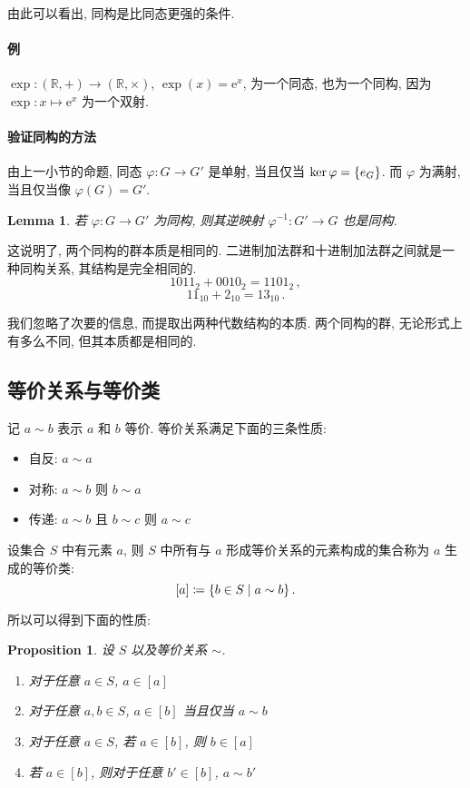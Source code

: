 \documentclass[UTF8]{ctexart}
\theoremstyle{mystyle}
\newtheorem{lemma}{Lemma}[section]
\newtheorem{proposition}{Proposition}[section]
\theoremstyle{myremark}
\theoremstyle{plain}
\newcommand{\mr}{\mathrm}
\newcommand{\R}{\mathbb R}
\DeclarePairedDelimiter\set{\{}{\}}
\begin{document}
由此可以看出, 同构是比同态更强的条件.

\paragraph{例}
$ \exp \colon (\R, +) \to (\R, \times) $, $ \exp(x) = \mr e^x $, 为一个同态, 也为一个同构, 因为 $ \exp \colon x \mapsto \mr e^x $ 为一个双射.

\paragraph{验证同构的方法}
由上一小节的命题, 同态 $ \varphi \colon G \to G' $ 是单射, 当且仅当 $ \ker \varphi = \set{e_G} $. 而 $ \varphi $ 为满射, 当且仅当像 $ \varphi(G) = G' $.

\begin{lemma}
    若 $ \varphi \colon G \to G' $ 为同构, 则其逆映射 $ \varphi^{-1} \colon G' \to G $ 也是同构.
\end{lemma}

这说明了, 两个同构的群本质是相同的. 二进制加法群和十进制加法群之间就是一种同构关系, 其结构是完全相同的.
\[ 1011_2 + 0010_2 = 1101_2 \,,\]
\[ 11_{10} + 2_{10} = 13_{10} \,.\]

我们忽略了次要的信息, 而提取出两种代数结构的本质. 两个同构的群, 无论形式上有多么不同, 但其本质都是相同的.


\subsection{等价关系与等价类}
记 $ a \sim b $ 表示 $ a $ 和 $ b $ 等价. 等价关系满足下面的三条性质:
\begin{itemize}
    \item 自反: $ a \sim a $
    \item 对称: $ a \sim b $ 则 $ b \sim a $
    \item 传递: $ a \sim b $ 且 $ b \sim c $ 则 $ a \sim c $
\end{itemize}

\begin{definition}
    设集合 $ S $ 中有元素 $ a $, 则 $ S $ 中所有与 $ a $ 形成等价关系的元素构成的集合称为 $ a $ 生成的等价类:
    \[ [a] \coloneqq \set{b \in S \mid a \sim b} \,.\]
\end{definition}

所以可以得到下面的性质:
\begin{proposition}
    设 $ S $ 以及等价关系 $ \sim $.
    \begin{enumerate}
        \item 对于任意 $ a \in S $, $ a \in [a] $
        \item 对于任意 $ a, b \in S $, $ a \in [b] $ 当且仅当 $ a \sim b $
        \item 对于任意 $ a \in S $, 若 $ a \in [b] $, 则 $ b \in [a] $
        \item 若 $ a \in [b] $, 则对于任意 $ b' \in [b] $, $ a \sim b' $
    \end{enumerate}
\end{proposition}
\end{document}
